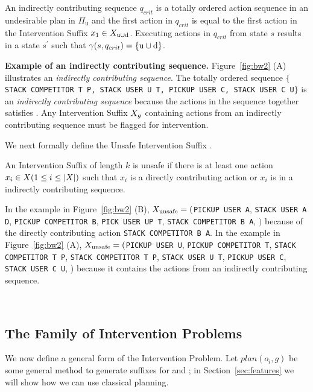 \begin{definition}
\label{def:indirect}
An \textnormal{indirectly contributing sequence} $q_{crit}$ is a totally ordered action sequence in an undesirable plan in $\Pi_{\mathrm{u}}$ and the first action in $q_{crit}$ is equal to the first action in the Intervention Suffix $x_1 \in X_{\mathrm{u}\cup\mathrm{d}}$. Executing actions in $q_{crit}$ from state $s$ results in a state $s^\prime$ such that $\gamma(s,q_{crit})=\lbrace\mathrm{u}\cup\mathrm{d}\rbrace$.
\end{definition}
 
\textbf{Example of an indirectly contributing sequence.} 
 Figure~\ref{fig:bw2} (A) illustrates an \textit{indirectly contributing sequence}. 
The totally ordered sequence \texttt{$\lbrace$STACK COMPETITOR T P, STACK USER U T, PICKUP USER C, STACK USER C U$\rbrace$} is an \textit{indirectly contributing sequence} because the actions in the sequence together satisfies \dandu. 
Any Intervention Suffix $X_{g}$ containing actions from an indirectly contributing sequence must be flagged for intervention.


We next formally define the Unsafe Intervention Suffix \SuffixUnsafe.
\begin{definition}
\label{def:unsafe}
An Intervention Suffix \Suffix of length $k$ is unsafe if there is at least one action $x_i \in X (1\leq i\leq |X|)$ such that $x_i$ is a directly contributing action or $x_i$ is in a indirectly contributing sequence.
\end{definition}

In the example in Figure~\ref{fig:bw2} (B), $X_{\textnormal{unsafe}}=($\texttt{PICKUP USER A}, \texttt{STACK USER A D}, \texttt{PICKUP COMPETITOR B}, \texttt{PICK USER UP T}, \texttt{STACK COMPETITOR B A}, \undesired$)$ because of the directly contributing action \texttt{STACK COMPETITOR B A}. In the example in Figure~\ref{fig:bw2} (A), $X_{\textnormal{unsafe}}=($\texttt{PICKUP USER U}, \texttt{PICKUP COMPETITOR T}, \texttt{STACK COMPETITOR T P}, \texttt{STACK COMPETITOR T P}, \texttt{STACK USER U T}, \texttt{PICKUP USER C}, \texttt{STACK USER C U}, \dandu) because it contains the actions from an indirectly contributing sequence.

~\subsection{The Family of Intervention Problems}
\label{sec:intervention-family}
We now define a general form of the Intervention Problem.
Let $plan(o_i, g)$ be some general method to generate suffixes for \planDesired and \planUndesired; in Section~\ref{sec:features} we will show how we can use classical planning.

